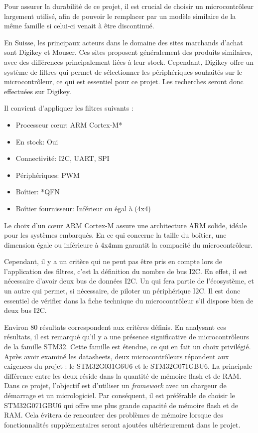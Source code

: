 Pour assurer la durabilité de ce projet, il est crucial de choisir un microcontrôleur largement utilisé, afin de pouvoir le remplacer par un modèle similaire de la même famille si celui-ci venait à être discontinué.

En Suisse, les principaux acteurs dans le domaine des sites marchands d'achat sont Digikey et Mouser.
Ces sites proposent généralement des produits similaires, avec des différences principalement liées à leur stock.
Cependant, Digikey offre un système de filtres qui permet de sélectionner les périphériques souhaités sur le microcontrôleur, ce qui est essentiel pour ce projet.
Les recherches seront donc effectuées sur Digikey.

Il convient d'appliquer les filtres suivants :

\begin{itemize}
    \item Processeur cœur: ARM Cortex-M*
    \item En stock: Oui
    \item Connectivité: I2C, UART, SPI
    \item Périphériques: PWM
    \item Boîtier: *QFN
    \item Boîtier fournisseur: Inférieur ou égal à (4x4)
\end{itemize}

Le choix d'un cœur ARM Cortex-M assure une architecture ARM solide, idéale pour les systèmes embarqués.
En ce qui concerne la taille du boîtier, une dimension égale ou inférieure à 4x4mm garantit la compacité du microcontrôleur.

Cependant, il y a un critère qui ne peut pas être pris en compte lors de l'application des filtres, c'est la définition du nombre de bus I2C.
En effet, il est nécessaire d'avoir deux bus de données I2C.
Un qui fera partie de l'écosystème, et un autre qui permet, si nécessaire, de piloter un périphérique I2C.
Il est donc essentiel de vérifier dans la fiche technique du microcontrôleur s'il dispose bien de deux bus I2C.

Environ 80 résultats correspondent aux critères définis.
En analysant ces résultats, il est remarqué qu'il y a une présence significative de microcontrôleurs de la famille STM32.
Cette famille est étendue, ce qui en fait un choix privilégié.
Après avoir examiné les datasheets, deux microcontrôleurs répondent aux exigences du projet : le STM32G031G6U6 et le STM32G071GBU6.
La principale différence entre les deux réside dans la quantité de mémoire flash et de RAM.
Dans ce projet, l'objectif est d'utiliser un \textit{framework} avec un chargeur de démarrage et un micrologiciel.
Par conséquent, il est préférable de choisir le STM32G071GBU6 qui offre une plus grande capacité de mémoire flash et de RAM.
Cela évitera de rencontrer des problèmes de mémoire lorsque des fonctionnalités supplémentaires seront ajoutées ultérieurement dans le projet.

